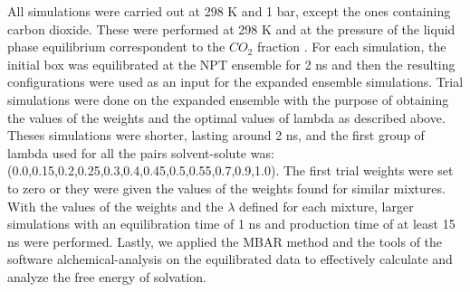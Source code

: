 All simulations were carried out at 298 K and 1 bar, except the ones containing carbon dioxide. These were performed at 298 K and at the pressure of the liquid phase equilibrium correspondent to the $CO_{2}$ fraction \cite{co2toliq} . For each simulation, the initial box was equilibrated at the NPT ensemble for 2 ns and then the resulting configurations were used as an input for the expanded ensemble simulations. Trial simulations were done on the expanded ensemble with the purpose of obtaining the values of the weights and the optimal values of lambda as described above. Theses simulations were shorter, lasting around 2 ns, and the first group of lambda used for all the pairs solvent-solute was: (0.0,0.15,0.2,0.25,0.3,0.4,0.45,0.5,0.55,0.7,0.9,1.0). The first trial weights were set to zero or they were given the values of the weights found for similar mixtures. With the values of the weights and the $\lambda $ defined for each mixture, larger simulations with an equilibration time of 1 ns and production time of at least 15 ns were performed. Lastly, we applied the MBAR method and the tools of the software alchemical-analysis \cite{klimovich} on the equilibrated data to effectively calculate and analyze the free energy of solvation.